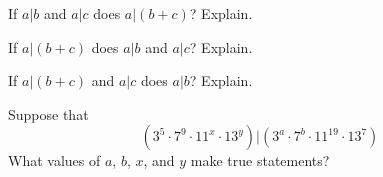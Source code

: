 \documentclass[nooutcomes]{ximera}
\begin{document}
\begin{problem}
If $a|b$ and $a|c$ does $a|(b+c)$?  Explain.  
\end{problem}

\begin{problem}
If $a|(b+c)$ does $a|b$ and $a|c$?  Explain.  
\end{problem}

\begin{problem}
If $a|(b+c)$ and $a|c$ does $a|b$?  Explain.  
\end{problem}

\begin{problem}
Suppose that $$(3^5\cdot 7^9\cdot 11^x\cdot 13^y)|(3^a\cdot 7^b\cdot 11^{19}\cdot 13^7)$$
What values of $a$, $b$, $x$, and $y$ make true statements? 
\end{problem}
\end{document}
